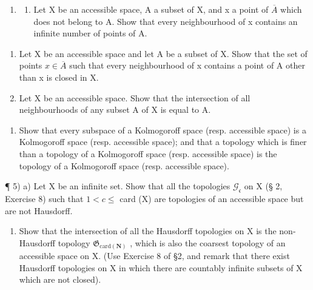 \begin{enumerate}
\def\labelenumi{\arabic{enumi})}
\setcounter{enumi}{2}
\tightlist
\item
  \begin{enumerate}
  \def\labelenumii{\alph{enumii})}
  \tightlist
  \item
    Let X be an accessible space, A a subset of X, and x a point of \(\overline{A}\) which does not belong to A. Show that every neighbourhood of x contains an infinite number of points of A.
  \end{enumerate}
\end{enumerate}

\begin{enumerate}
\def\labelenumi{\alph{enumi})}
\setcounter{enumi}{1}
\item
  Let X be an accessible space and let A be a subset of X. Show that the set of points \(x \in \overline{A}\) such that every neighbourhood of x contains a point of A other than x is closed in X.
\item
  Let X be an accessible space. Show that the intersection of all neighbourhoods of any subset A of X is equal to A.
\end{enumerate}

\begin{enumerate}
\def\labelenumi{\arabic{enumi})}
\setcounter{enumi}{3}
\tightlist
\item
  Show that every subspace of a Kolmogoroff space (resp. accessible space) is a Kolmogoroff space (resp. accessible space); and that a topology which is finer than a topology of a Kolmogoroff space (resp. accessible space) is the topology of a Kolmogoroff space (resp. accessible space).
\end{enumerate}

¶ 5) a) Let X be an infinite set. Show that all the topologies \(\mathcal{G}_{\mathfrak{c}}\) on X (§ 2, Exercise 8) such that \(1 < c \leqslant\) card (X) are topologies of an accessible space but are not Hausdorff.

\begin{enumerate}
\def\labelenumi{\alph{enumi})}
\setcounter{enumi}{1}
\tightlist
\item
  Show that the intersection of all the Hausdorff topologies on X is the non-Hausdorff topology \(\mathfrak{G}_{\mathrm{card}(\mathbf{N})}\) , which is also the coarsest topology of an accessible space on X. (Use Exercise 8 of §2, and remark that there exist Hausdorff topologies on X in which there are countably infinite subsets of X which are not closed).
\end{enumerate}

